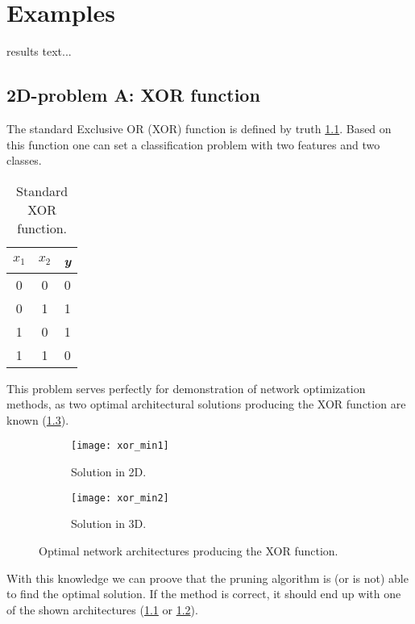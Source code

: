 \chapter{Examples} \label{chap:examples}
results text...

\section{2D-problem A: XOR function} \label{sec:dataset_xor}
The standard Exclusive OR (XOR) function is defined by truth \cref{tab:examples:xor_function}. Based on this function one can set a classification problem with two features and two classes.

\begin{table}[H]
\centering
\begin{tabular}{|c|c||c|}
\hline
\textit{$ x_1 $} & \textit{$ x_2 $} & \textit{y} \\ \hline \hline
0                & 0                & 0          \\ \hline
0                & 1                & 1          \\ \hline
1                & 0                & 1          \\ \hline
1                & 1                & 0          \\ \hline
\end{tabular}
\caption{Standard XOR function.}
\label{tab:examples:xor_function}
\end{table}

This problem serves perfectly for demonstration of network optimization methods, as two optimal architectural solutions producing the XOR function are known (\cref{fig:examples:xor_solutions}). 

\begin{figure}[H]
\centering
\begin{subfigure}{.4\textwidth}
  \centering
  \texttt{[image: xor\_min1]}
  \caption{Solution in 2D.}
  \label{fig:examples:xor_min1}
\end{subfigure}
\begin{subfigure}{.4\textwidth}
  \centering
  \texttt{[image: xor\_min2]}
  \caption{Solution in 3D.}
  \label{fig:examples:xor_min2}
\end{subfigure}
\caption{Optimal network architectures producing the XOR function.}
\label{fig:examples:xor_solutions}
\end{figure}

With this knowledge we can proove that the pruning algorithm is (or is not) able to find the optimal solution. If the method is correct, it should end up with one of the shown architectures (\cref{fig:examples:xor_min1} or \cref{fig:examples:xor_min2}).

